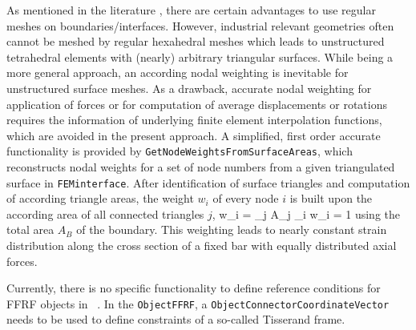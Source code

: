 \label{sec:theory:CMS:nodeWeighting}
%
As mentioned in the literature \cite{HeirmanDesmet2010}, there are certain advantages to use regular meshes on boundaries/interfaces.
However, industrial relevant geometries often cannot be meshed by regular hexahedral meshes which leads to unstructured tetrahedral elements with (nearly) arbitrary triangular surfaces.
While being a more general approach, an according nodal weighting is inevitable for unstructured surface meshes.
As a drawback, accurate nodal weighting for application of forces or for computation of average displacements or rotations requires the information of underlying finite element interpolation functions, which are avoided in the present approach.
A simplified, first order accurate functionality is provided by \texttt{GetNodeWeightsFromSurfaceAreas}, which reconstructs nodal weights for a set of node numbers from a given triangulated surface in \texttt{FEMinterface}.
After identification of surface triangles and computation of according triangle areas, the weight $w_i$ of every node $i$ is built upon the according area of all connected triangles $j$,
\be
  w_i =  \sum_{j} A_j  \eqComma \quad {} \quad \sum_i w_i = 1
\ee
using the total area $A_B$ of the boundary. 
This weighting leads to nearly constant strain distribution along the cross section of a fixed bar with equally distributed axial forces.

\label{sec:theory:CMS:referenceConditions}
%
Currently, there is no specific functionality to define reference conditions for \ac{FFRF} objects in \codeName\ .
In the \texttt{ObjectFFRF}, a \texttt{ObjectConnectorCoordinateVector} needs to be used to define constraints of a so-called Tisserand frame.

